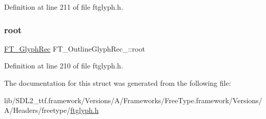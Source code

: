 Definition at line 211 of file ftglyph.\+h.

\mbox{\label{struct_f_t___outline_glyph_rec___a71e5a8d5fe69e0cea68c96486dd6713f}} 
\subsubsection{\texorpdfstring{root}{root}}
{\footnotesize\ttfamily \mbox{\hyperlink{ftglyph_8h_a095b515f46c978b33ffc9c20aad081a4}{F\+T\+\_\+\+Glyph\+Rec}} F\+T\+\_\+\+Outline\+Glyph\+Rec\+\_\+\+::root}



Definition at line 210 of file ftglyph.\+h.



The documentation for this struct was generated from the following file\+:\begin{DoxyCompactItemize}
\item 
lib/\+S\+D\+L2\+\_\+ttf.\+framework/\+Versions/\+A/\+Frameworks/\+Free\+Type.\+framework/\+Versions/\+A/\+Headers/freetype/\mbox{\hyperlink{ftglyph_8h}{ftglyph.\+h}}\end{DoxyCompactItemize}
